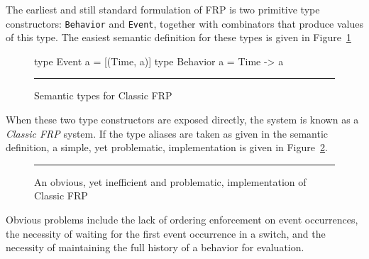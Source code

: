 The earliest and still standard formulation of FRP is two primitive type
constructors: {\tt Behavior} and {\tt Event}, together with combinators that
produce values of this type. The easiest semantic definition for these types
is given in Figure~\ref{figure:classic_frp_semantic_types}

\begin{figure}
\begin{code}
type Event a = [(Time, a)]
type Behavior a = Time -> a
\end{code}
\hrule
\caption{Semantic types for Classic FRP}
\label{figure:classic_frp_semantic_types}
\end{figure}


When these two type constructors are exposed directly, the system is known as a 
{\em Classic FRP} system. If the type aliases are taken as given in the semantic
definition, a simple, yet problematic, implementation is given in
Figure~\ref{figure:classic_frp_simple_implementation}.

\begin{figure}
\hrule
\caption{An obvious, yet inefficient and problematic, implementation of
Classic FRP}
\label{figure:classic_frp_simple_implementation}
\end{figure}

Obvious problems include the lack of ordering enforcement on event occurrences,
the necessity of waiting for the first event occurrence in a switch, and the
necessity of maintaining the full history of a behavior for evaluation.


